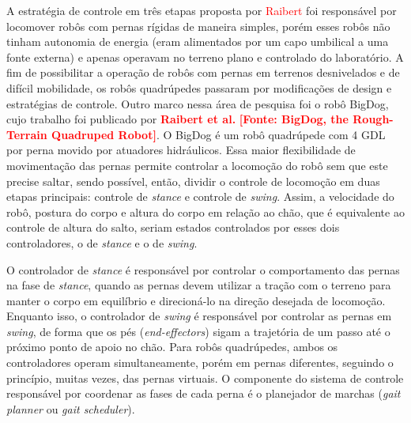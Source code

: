 \documentclass[../main.tex]{subfiles}
\begin{document}
  A estratégia de controle em três etapas proposta por \textcolor{red}{Raibert} foi responsável por locomover robôs com pernas rígidas de maneira simples, porém esses robôs não tinham autonomia de energia (eram alimentados por um capo umbilical a uma fonte externa) e apenas operavam no terreno plano e controlado do laboratório. A fim de possibilitar a operação de robôs com pernas em terrenos desnivelados e de difícil mobilidade, os robôs quadrúpedes passaram por modificações de design e estratégias de controle. Outro marco nessa área de pesquisa foi o robô BigDog, cujo trabalho foi publicado por \textbf{\textcolor{red}{Raibert et al.}} \textbf{\textcolor{red}{[Fonte: BigDog, the Rough-Terrain Quadruped Robot]}}. O BigDog é um robô quadrúpede com 4 GDL por perna movido por atuadores hidráulicos. Essa maior flexibilidade de movimentação das pernas permite controlar a locomoção do robô sem que este precise saltar, sendo possível, então, dividir o controle de locomoção em duas etapas principais: controle de \textit{stance} e controle de \textit{\textit{swing}}. Assim, a velocidade do robô, postura do corpo e altura do corpo em relação ao chão, que é equivalente ao controle de altura do salto, seriam estados controlados por esses dois controladores, o de \textit{\textit{stance}} e o de \textit{\textit{swing}}.

  O controlador de \textit{stance} é responsável por controlar o comportamento das pernas na fase de \textit{stance}, quando as pernas devem utilizar a tração com o terreno para manter o corpo em equilíbrio e direcioná-lo na direção desejada de locomoção. Enquanto isso, o controlador de \textit{\textit{swing}} é responsável por controlar as pernas em \textit{swing}, de forma que os pés (\textit{end-effectors}) sigam a trajetória de um passo até o próximo ponto de apoio no chão. Para robôs quadrúpedes, ambos os controladores operam simultaneamente, porém em pernas diferentes, seguindo o princípio, muitas vezes, das pernas virtuais. O componente do sistema de controle responsável por coordenar as fases de cada perna é o planejador de marchas (\textit{gait planner} ou \textit{gait scheduler}).
\end{document}
